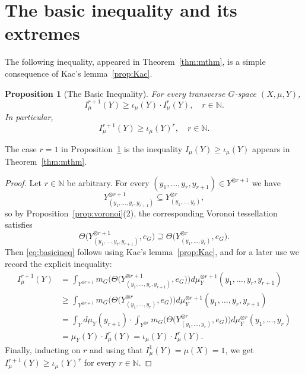 \documentclass{amsart}
\numberwithin{equation}{subsection}
\newtheorem{prop}[thm]{Proposition}
\theoremstyle{remark}
\begin{document}
\section{The basic inequality and its extremes}

The following inequality, appeared in Theorem~\ref{thm:mthm}, is a simple consequence of Kac's lemma~\ref{prop:Kac}.

\begin{prop}[The Basic Inequality]\label{prop:basicineq}
For every transverse \(G\)-space \(\left(X,\mu,Y\right)\),
\begin{equation}\label{eq:basicineq}
I_{\mu}^{r+1}\left(Y\right)\geq\iota_{\mu}\left(Y\right)\cdot I_{\mu}^{r}\left(Y\right),\quad r\in\mathbb{N}.
\end{equation}
In particular,
\[I_{\mu}^{r+1}\left(Y\right)\geq\iota_{\mu}\left(Y\right)^{r},\quad r\in\mathbb{N}.\]
\end{prop}

The case \(r=1\) in Proposition~\ref{prop:basicineq} is the inequality \(I_{\mu}\left(Y\right)\geq\iota_{\mu}\left(Y\right)\) appears in Theorem~\ref{thm:mthm}.

\begin{proof}
Let \(r\in\mathbb{N}\) be arbitrary. For every \(\left(y_{1},\dotsc,y_{r},y_{r+1}\right)\in Y^{\otimes r+1}\) we have
\[Y_{\left(y_{1},\dotsc,y_{r},y_{r+1}\right)}^{\otimes r+1}\subseteq Y_{\left(y_{1},\dotsc,y_{r}\right)}^{\otimes r},\]
so by Proposition~\ref{prop:voronoi}(2), the corresponding Voronoi tessellation satisfies
\[\Theta\big(Y_{\left(y_{1},\dotsc,y_{r},y_{r+1}\right)}^{\otimes r+1},e_{G}\big)\supseteq \Theta\big(Y_{\left(y_{1},\dotsc,y_{r}\right)}^{\otimes r},e_{G}\big).\]
Then \eqref{eq:basicineq} follows using Kac's lemma~\ref{prop:Kac}, and for a later use we record the explicit inequality:
\begin{equation}\label{eq:latus}
\begin{aligned}
I_{\mu}^{r+1}\left(Y\right)
&=\int_{Y^{\otimes r+1}}m_{G}\big(\Theta\big(Y_{\left(y_{1},\dotsc,y_{r},y_{r+1}\right)}^{\otimes r+1},e_{G}\big)\big)d\mu_{Y}^{\otimes r+1}\left(y_{1},\dotsc,y_{r},y_{r+1}\right)\\
&\geq\int_{Y^{\otimes r+1}}m_{G}\big(\Theta\big(Y_{\left(y_{1},\dotsc,y_{r}\right)}^{\otimes r},e_{G}\big)\big)d\mu_{Y}^{\otimes r+1}\left(y_{1},\dotsc,y_{r},y_{r+1}\right)\\
&=\int_{Y}d\mu_{Y}\left(y_{r+1}\right)\cdot \int_{Y^{\otimes r}}m_{G}\big(\Theta\big(Y_{\left(y_{1},\dotsc,y_{r}\right)}^{\otimes r},e_{G}\big)\big)d\mu_{Y}^{\otimes r}\left(y_{1},\dotsc,y_{r}\right)\\
&=\mu_{Y}\left(Y\right)\cdot I_{\mu}^{r}\left(Y\right)=\iota_{\mu}\left(Y\right)\cdot I_{\mu}^{r}\left(Y\right).
\end{aligned}
\end{equation}
Finally, inducting on \(r\) and using that \(I_{\mu}^{1}\left(Y\right)=\mu\left(X\right)=1\), we get \(I_{\mu}^{r+1}\left(Y\right)\geq\iota_{\mu}\left(Y\right)^{r}\) for every \(r\in\mathbb{N}\).
\end{proof}
\end{document}
